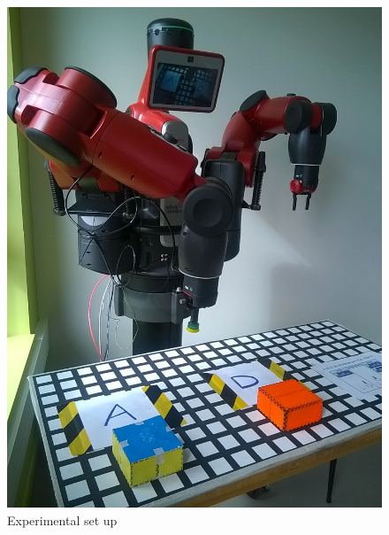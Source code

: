 \begin{figure}[h]
	\centering
	\begin{minipage}{0.5\textwidth}
		\centering
		\includegraphics[scale=0.2]{figures/experiment}
		\caption{Experimental set up}
		\label{fig:Experimental set up}
	\end{minipage}%
	\begin{minipage}{.5\textwidth}
		\centering

\end{minipage}
\end{figure}
